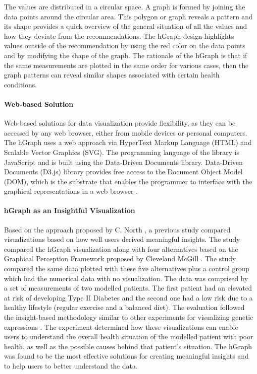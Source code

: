 \documentclass[twocolumn]{bmcart}%
\begin{document}
The values are distributed in a circular space. A graph is formed by joining the data points around the circular area. This polygon or graph reveals a pattern and its shape provides a quick overview of the general situation of all the values and how they deviate from the recommendations. The hGraph design highlights values outside of the recommendation by using the red color on the data points and by modifying the shape of the graph. The rationale of the hGraph is that if the same measurements are plotted in the same order for various cases, then the graph patterns can reveal similar shapes associated with certain health conditions.

\paragraph*{Web-based Solution}
Web-based solutions for data visualization provide flexibility, as they can be accessed by any web browser, either from mobile devices or personal computers. The hGraph uses a web approach via HyperText Markup Language (HTML) and Scalable Vector Graphics (SVG). The programming language of the library is JavaScript and is built using the Data-Driven Documents library. Data-Driven Documents (D3.js) library provides free access to the Document Object Model (DOM), which is the substrate that enables the programmer to interface with the graphical representations in a web browser \cite{bostock2011d3}.

\paragraph*{hGraph as an Insightful Visualization}
Based on the approach proposed by C. North \cite{north2006toward}, a previous study \cite{EMBCLedNiem} compared visualizations based on how well users derived meaningful insights. The study compared the hGraph visualization along with four alternatives based on the Graphical Perception Framework proposed by Cleveland McGill \cite{cleveland1984graphical}. The study compared the same data plotted with these five alternatives plus a control group which had the numerical data with no visualization. The data was comprised by a set of measurements of two modelled patients. The first patient had an elevated at risk of developing Type II Diabetes and the second one had a low risk due to a healthy lifestyle (regular exercise and a balanced diet). The evaluation followed the insight-based methodology similar to other experiments for visualizing genetic expressions \cite{saraiya2004evaluation}. The experiment determined how these visualizations can enable users to understand the overall health situation of the modelled patient with poor health, as well as the possible causes behind that patient's situation. The hGraph was found to be the most effective solutions for creating meaningful insights and to help users to better understand the data.
\end{document}
